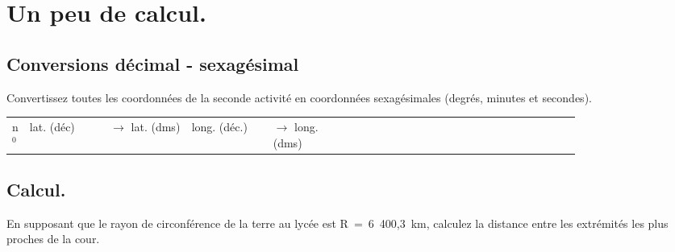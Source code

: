 \documentclass[12pt,a4paper,notitlepage,twoside]{article}
\begin{document}
\section{Un peu de calcul.}
\subsection{Conversions décimal - sexagésimal}
Convertissez toutes les coordonnées de la seconde activité en coordonnées sexagésimales (degrés, minutes et secondes). 
\begin{table}
	\centering
	\begin{tabular}{| m{0.02\linewidth} |  m{0.20\linewidth}  m{0.20\linewidth} || m{0.20\linewidth}  m{0.20\linewidth} |}
		\hline
		n$^0$ & lat. (déc) & $\rightarrow$ lat. (dms) & long. (déc.) & $\rightarrow$ long. (dms) \cr
		 &  &  &  &  \cr
		 &  &  &  &  \cr
		 &  &  &  &  \cr
		 &  &  &  &  \cr
		 &  &  &  &  \cr
		\hline
	\end{tabular}
\end{table}

\subsection{Calcul.}
En supposant que le rayon de circonférence de la terre au lycée est R~=~6~400,3~km, calculez la distance entre les extrémités les plus proches de la cour.
\end{document}
